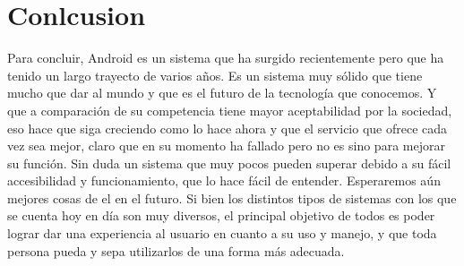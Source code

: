 \documentclass{bmcart}
\begin{document}
\newpage
\section*{Conlcusion}

Para concluir, Android es un sistema que ha surgido recientemente pero que ha tenido un largo trayecto de varios años.\newline
Es un sistema muy sólido que tiene mucho que dar al mundo y que es el futuro de la tecnología que conocemos.\newline
Y que a comparación de su competencia tiene mayor aceptabilidad por la sociedad, eso hace que siga creciendo como lo hace ahora y que el servicio que ofrece cada vez sea mejor, claro que en su momento ha fallado pero no es sino para mejorar su función.\newline
Sin duda un sistema que muy pocos pueden superar debido a su fácil accesibilidad y funcionamiento, que lo hace fácil de entender.
Esperaremos aún mejores cosas de el en el futuro.\newline
Si bien los distintos tipos de sistemas con los que se cuenta hoy en día son muy diversos, el principal objetivo de todos es poder lograr dar una experiencia al usuario en cuanto a su uso y manejo, y que toda persona pueda y sepa utilizarlos de una forma más adecuada.


\newpage

\end{document}
